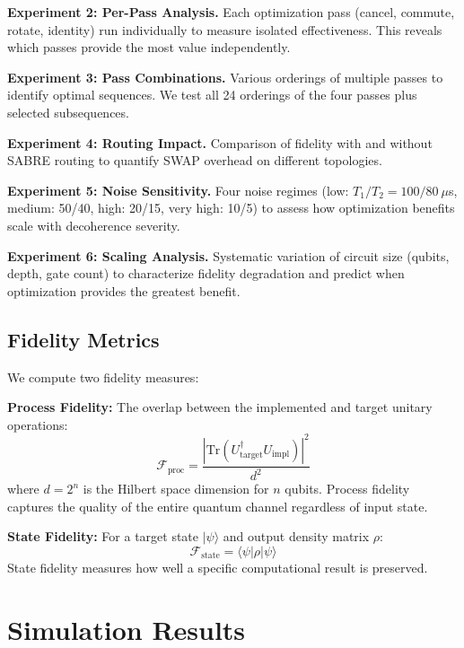 \documentclass[journal]{IEEEtran}
\newcommand{\ket}[1]{|#1\rangle}
\newcommand{\bra}[1]{\langle#1|}
\newcommand{\fid}{\mathcal{F}}
\begin{document}
\textbf{Experiment 2: Per-Pass Analysis.} Each optimization pass (cancel, commute, rotate, identity) run individually to measure isolated effectiveness. This reveals which passes provide the most value independently.

\textbf{Experiment 3: Pass Combinations.} Various orderings of multiple passes to identify optimal sequences. We test all 24 orderings of the four passes plus selected subsequences.

\textbf{Experiment 4: Routing Impact.} Comparison of fidelity with and without SABRE routing to quantify SWAP overhead on different topologies.

\textbf{Experiment 5: Noise Sensitivity.} Four noise regimes (low: $T_1/T_2 = 100/80\ \mu$s, medium: 50/40, high: 20/15, very high: 10/5) to assess how optimization benefits scale with decoherence severity.

\textbf{Experiment 6: Scaling Analysis.} Systematic variation of circuit size (qubits, depth, gate count) to characterize fidelity degradation and predict when optimization provides the greatest benefit.

\subsection{Fidelity Metrics}

We compute two fidelity measures:

\textbf{Process Fidelity:} The overlap between the implemented and target unitary operations:
\begin{equation}
    \fid_{\text{proc}} = \frac{|\text{Tr}(U_{\text{target}}^{\dagger} U_{\text{impl}})|^2}{d^2}
\end{equation}
where $d = 2^n$ is the Hilbert space dimension for $n$ qubits. Process fidelity captures the quality of the entire quantum channel regardless of input state.

\textbf{State Fidelity:} For a target state $\ket{\psi}$ and output density matrix $\rho$:
\begin{equation}
    \fid_{\text{state}} = \bra{\psi}\rho\ket{\psi}
\end{equation}
State fidelity measures how well a specific computational result is preserved.

\section{Simulation Results}
\label{sec:results}
\end{document}
